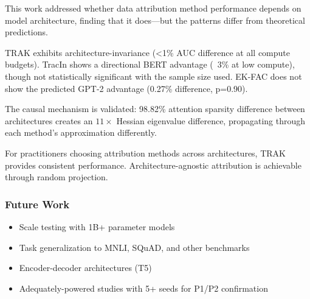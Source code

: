 
This work addressed whether data attribution method performance depends on model architecture, finding that it does---but the patterns differ from theoretical predictions.

TRAK exhibits architecture-invariance (<1\% AUC difference at all compute budgets). TracIn shows a directional BERT advantage (~3\% at low compute), though not statistically significant with the sample size used. EK-FAC does not show the predicted GPT-2 advantage (0.27\% difference, p=0.90).

The causal mechanism is validated: 98.82\% attention sparsity difference between architectures creates an $11\times$ Hessian eigenvalue difference, propagating through each method's approximation differently.

For practitioners choosing attribution methods across architectures, TRAK provides consistent performance. Architecture-agnostic attribution is achievable through random projection.

\subsubsection{Future Work}

\begin{itemize}
\item Scale testing with 1B+ parameter models
\item Task generalization to MNLI, SQuAD, and other benchmarks
\item Encoder-decoder architectures (T5)
\item Adequately-powered studies with 5+ seeds for P1/P2 confirmation
\end{itemize}
